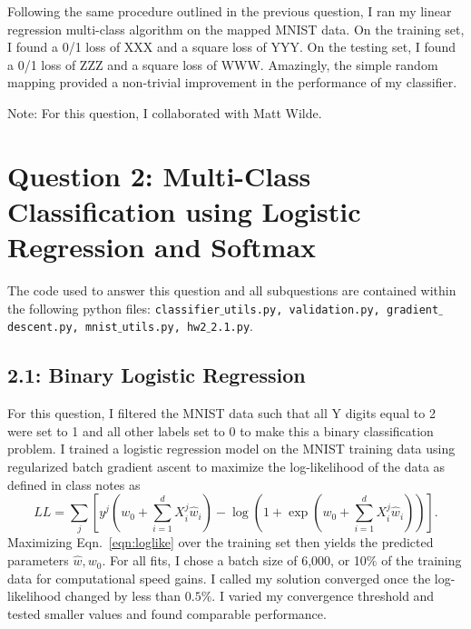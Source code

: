 \documentclass[12pt]{amsart}
\begin{document}
Following the same procedure outlined in the previous question, I ran my linear regression multi-class algorithm on the mapped MNIST data.  On the training set, I found a 0/1 loss of XXX and a square loss of YYY.  On the testing set, I found a 0/1 loss of ZZZ and a square loss of WWW.  Amazingly, the simple random mapping provided a non-trivial improvement in the performance of my classifier.

Note: For this question, I collaborated with Matt Wilde.

\section*{Question 2: Multi-Class Classification using Logistic Regression and Softmax}

The code used to answer this question and all subquestions are contained within the following python files: {\tt classifier$\_$utils.py, validation.py, gradient$\_$descent.py, mnist$\_$utils.py, hw2$\_$2.1.py}.

\subsection*{2.1: Binary Logistic Regression}

For this question, I filtered the MNIST data such that all Y digits equal to 2 were set to 1 and all other labels set to 0 to make this a binary classification problem.  I trained a logistic regression model on the MNIST training data using regularized batch gradient ascent to maximize the log-likelihood of the data as defined in class notes as
\begin{equation} \label{eqn:loglike}
LL = \sum_j [y^j (w_0 + \sum_{i=1}^d X_i^j \hat{w}_i) - \log(1+ \exp(w_0 + \sum_{i=1}^d X_i^j \hat{w}_i))].
\end{equation}
Maximizing Eqn.~\ref{eqn:loglike} over the training set then yields the predicted parameters $\hat{w}, w_0$.  For all fits, I chose a batch size of 6,000, or 10$\%$ of the training data for computational speed gains.  I called my solution converged once the log-likelihood changed by less than $0.5 \%$.  I varied my convergence threshold and tested smaller values and found comparable performance.
\end{document}
